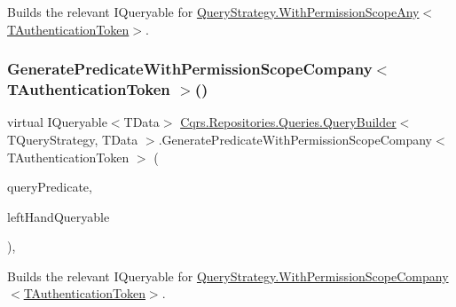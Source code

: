 Builds the relevant I\+Queryable for \hyperlink{classCqrs_1_1Repositories_1_1Queries_1_1QueryStrategy_a7fda4380a88972201258bf695ccaf287_a7fda4380a88972201258bf695ccaf287}{Query\+Strategy.\+With\+Permission\+Scope\+Any$<$\+T\+Authentication\+Token$>$}. 

\mbox{\label{classCqrs_1_1Repositories_1_1Queries_1_1QueryBuilder_aa1341909b87629158efa619af12cec5f_aa1341909b87629158efa619af12cec5f}} 
\subsubsection{\texorpdfstring{Generate\+Predicate\+With\+Permission\+Scope\+Company$<$ T\+Authentication\+Token $>$()}{GeneratePredicateWithPermissionScopeCompany< TAuthenticationToken >()}}
{\footnotesize\ttfamily virtual I\+Queryable$<$T\+Data$>$ \hyperlink{classCqrs_1_1Repositories_1_1Queries_1_1QueryBuilder}{Cqrs.\+Repositories.\+Queries.\+Query\+Builder}$<$ T\+Query\+Strategy, T\+Data $>$.Generate\+Predicate\+With\+Permission\+Scope\+Company$<$ T\+Authentication\+Token $>$ (\begin{DoxyParamCaption}\item[{\hyperlink{classCqrs_1_1Repositories_1_1Queries_1_1QueryPredicate}{Query\+Predicate}}]{query\+Predicate,  }\item[{I\+Queryable$<$ T\+Data $>$}]{left\+Hand\+Queryable }\end{DoxyParamCaption})\hspace{0.3cm}{\ttfamily [protected]}, {\ttfamily [virtual]}}



Builds the relevant I\+Queryable for \hyperlink{classCqrs_1_1Repositories_1_1Queries_1_1QueryStrategy_a822a0901976ceadb3f096326860e3006_a822a0901976ceadb3f096326860e3006}{Query\+Strategy.\+With\+Permission\+Scope\+Company$<$\+T\+Authentication\+Token$>$}. 

